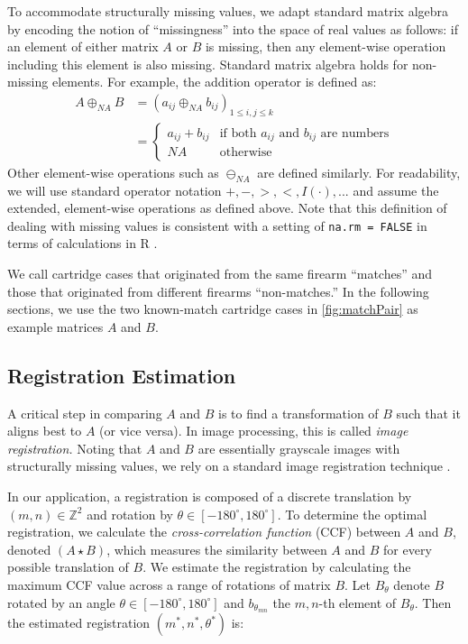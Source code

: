 \documentclass[reprint]{JASA}
\begin{document}
To accommodate structurally missing values, we adapt standard matrix
algebra by encoding the notion of ``missingness'' into the space of real
values as follows: if an element of either matrix \(A\) or \(B\) is
missing, then any element-wise operation including this element is also
missing. Standard matrix algebra holds for non-missing elements. For
example, the addition operator is defined as: \begin{align*}
A \oplus_{NA} B &= (a_{ij} \oplus_{NA} b_{ij})_{1 \leq i,j \leq k} \\
&=  \begin{cases}
a_{ij} + b_{ij} & \text{if both $a_{ij}$ and $b_{ij}$ are numbers} \\
NA &\text{otherwise}
\end{cases}
\end{align*} Other element-wise operations such as \(\ominus_{NA}\) are
defined similarly. For readability, we will use standard operator
notation \(+, -, >, <, I(\cdot), ...\) and assume the extended,
element-wise operations as defined above. Note that this definition of
dealing with missing values is consistent with a setting of
\texttt{na.rm\ =\ FALSE} in terms of calculations in R
\citep{Rlanguage}.

We call cartridge cases that originated from the same firearm
``matches'' and those that originated from different firearms
``non-matches.'' In the following sections, we use the two known-match
cartridge cases in \autoref{fig:matchPair} as example matrices \(A\) and
\(B\).

\hypertarget{registration-estimation}{%
\subsection{Registration Estimation}\label{registration-estimation}}

A critical step in comparing \(A\) and \(B\) is to find a transformation
of \(B\) such that it aligns best to \(A\) (or vice versa). In image
processing, this is called \emph{image registration.} Noting that \(A\)
and \(B\) are essentially grayscale images with structurally missing
values, we rely on a standard image registration technique
\citep{Brown1992}.

In our application, a registration is composed of a discrete translation
by \((m,n) \in \mathbb{Z}^2\) and rotation by
\(\theta \in [-180^\circ,180^\circ]\). To determine the optimal
registration, we calculate the \emph{cross-correlation function} (CCF)
between \(A\) and \(B\), denoted \((A \star B)\), which measures the
similarity between \(A\) and \(B\) for every possible translation of
\(B\). We estimate the registration by calculating the maximum CCF value
across a range of rotations of matrix \(B\). Let \(B_\theta\) denote
\(B\) rotated by an angle \(\theta \in [-180^\circ,180^\circ]\) and
\(b_{\theta_{mn}}\) the \(m,n\)-th element of \(B_\theta\). Then the
estimated registration \((m^*,n^*,\theta^*)\) is:
\end{document}
